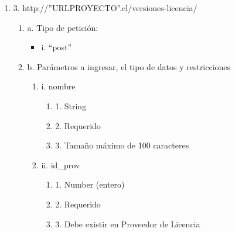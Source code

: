 \begin{enumerate}
    \item 3. http://”URLPROYECTO”.cl/versiones-licencia/
    \begin{enumerate}
        \item a. Tipo de petición:
            \begin{itemize}
               \item i. “post”
            \end{itemize}
        \item b. Parámetros a ingresar, el tipo de datos y restricciones
            \begin{enumerate}
                \item i. nombre
                    \begin{enumerate}
                        \item 1. String
                        \item 2. Requerido
                        \item 3. Tamaño máximo de 100 caracteres
                    \end{enumerate}
                \item ii. id\_prov
                    \begin{enumerate}
                        \item 1. Number (entero)
                        \item 2. Requerido
                        \item 3. Debe existir en Proveedor de Licencia
                    \end{enumerate}
            \end{enumerate}
    \end{enumerate}


\end{enumerate}
